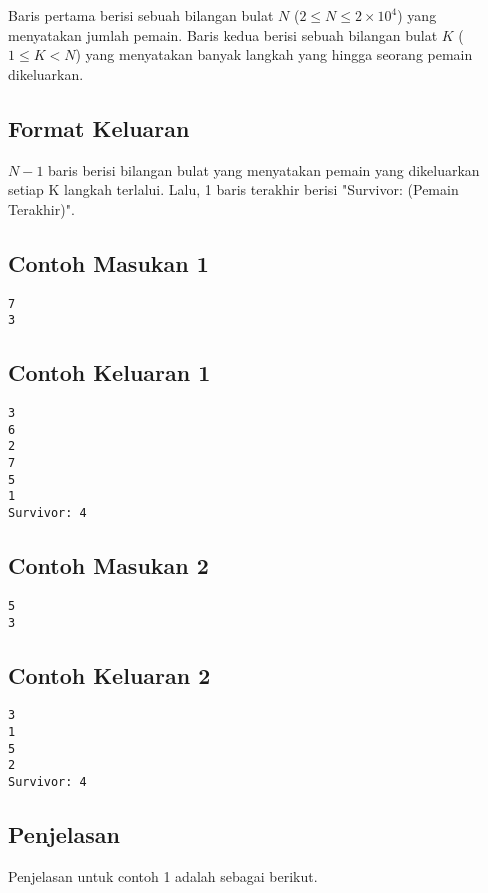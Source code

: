 \documentclass{article}
\begin{document}
Baris pertama berisi sebuah bilangan bulat $N$ ($2 \leq N \leq 2 \times 10^{4}$) yang menyatakan jumlah pemain. Baris kedua berisi sebuah bilangan bulat $K$ ($1 \leq K < N$) yang menyatakan banyak langkah yang hingga seorang pemain dikeluarkan.

\subsection*{Format Keluaran}

$N - 1$ baris berisi bilangan bulat yang menyatakan pemain yang dikeluarkan setiap K langkah terlalui. Lalu, 1 baris terakhir berisi "Survivor: (Pemain Terakhir)".

\begin{multicols}{2}
\subsection*{Contoh Masukan 1}
\begin{lstlisting}
7
3
\end{lstlisting}
\vfill
\null
\columnbreak
\subsection*{Contoh Keluaran 1}
\begin{lstlisting}
3
6
2
7
5
1
Survivor: 4
\end{lstlisting}
\end{multicols}

\begin{multicols}{2}
\subsection*{Contoh Masukan 2}
\begin{lstlisting}
5
3
\end{lstlisting}
\vfill
\null
\columnbreak
\subsection*{Contoh Keluaran 2}
\begin{lstlisting}
3
1
5
2
Survivor: 4
\end{lstlisting}
\end{multicols}


\subsection*{Penjelasan}

Penjelasan untuk contoh 1 adalah sebagai berikut.
\end{document}

